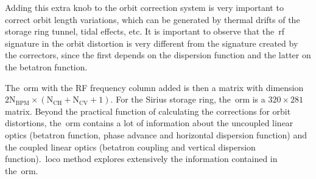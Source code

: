 Adding this extra knob to the orbit correction system is very important to correct orbit length variations, which can be generated by thermal drifts of the storage ring tunnel, tidal effects, etc. It is important to observe that the~\gls{rf} signature in the orbit distortion is very different from the signature created by the correctors, since the first depends on the dispersion function and the latter on the betatron function.

The~\gls{orm} with the RF frequency column added is then a matrix with dimension $2 \mathrm{N}_{\mathrm{BPM}} \times \left(\mathrm{N}_{\mathrm{CH}} + \mathrm{N}_{\mathrm{CV}}+1\right)$. For the Sirius storage ring, the~\gls{orm} is a $320 \times 281$ matrix. Beyond the practical function of calculating the corrections for orbit distortions, the~\gls{orm} contains a lot of information about the uncoupled linear optics (betatron function, phase advance and horizontal dispersion function) and the coupled linear optics (betatron coupling and vertical dispersion function).~\gls{loco} method explores extensively the information contained in the~\gls{orm}.



